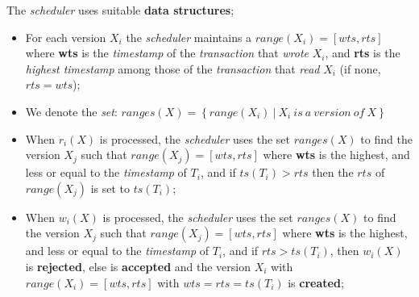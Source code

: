 \documentclass{article}
\begin{document}
The \emph{scheduler} uses suitable \textbf{data structures};
\begin{itemize}
\item For each version $X_i$ the \emph{scheduler} maintains a $range(X_i) = [wts, rts]$ where \textbf{wts} is the \emph{timestamp} of the \emph{transaction} that \emph{wrote} $X_i$, and \textbf{rts} is the \emph{highest timestamp} among those of the \emph{transaction} that \emph{read} $X_i$ (if none, $rts=wts$);
\item We denote the \emph{set}: $ranges(X) = \left \{ range(X_i)\ |\ X_i\ is\ a\ version\ of\ X \right \}$
\item When $r_i(X)$ is processed, the \emph{scheduler} uses the set $ranges(X)$ to find the version $X_j$ such that $range(X_j) = [wts, rts]$ where \textbf{wts} is the highest, and less or equal to the \emph{timestamp} of $T_i$, and if $ts(T_i) > rts$ then the $rts$ of $range(X_j)$ is set to $ts(T_i)$;
\item When $w_i(X)$ is processed, the \emph{scheduler} uses the set $ranges(X)$ to find the version $X_j$ such that $range(X_j) = [wts, rts]$ where \textbf{wts} is the highest, and less or equal to the \emph{timestamp} of $T_i$, and if $rts > ts(T_i)$, then $w_i(X)$ is \textbf{rejected}, else is \textbf{accepted} and the version $X_i$ with $range(X_i) = [wts,rts]$ with $wts = rts = ts(T_i)$ is \textbf{created};
\end{itemize}
\end{document}
